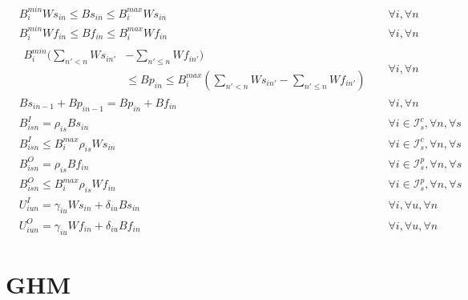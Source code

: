 \begin{align}
		  & B_{i}^{min} Ws_{in} \le Bs_{in} \le B_{i}^{max} Ws_{in} &&  \forall i, \forall n \\
		  & B_{i}^{min} Wf_{in} \le Bf_{in} \le B_{i}^{max} Wf_{in} &&  \forall i, \forall n \\
&\begin{aligned}
		   B_{i}^{min} (\sum_{n' < n} Ws_{in'} & - \sum_{n' \le n} Wf_{in'})\\ &\le Bp_{in} \le B_{i}^{max}  (\sum_{n' < n} Ws_{in'} - \sum_{n' \le n} Wf_{in'})  
\end{aligned}  && \forall i, \forall n \\
		  &Bs_{in-1} + Bp_{in-1} = Bp_{in} + Bf_{in} && \forall i, \forall n \\
		  &B_{isn}^I = \rho_{is} Bs_{in} && \forall i \in \mathcal{I}_{s}^c, \forall n, \forall s \\
		  &B_{isn}^I \le B_{i}^{max} \rho_{is} Ws_{in}  && \forall i \in \mathcal{I}_{s}^c, \forall n, \forall s \\
		  &B_{isn}^O = \rho_{is} Bf_{in} && \forall i \in \mathcal{I}_{s}^p, \forall n, \forall s \\
		  &B_{isn}^O \le B_{i}^{max} \rho_{is} Wf_{in}  && \forall i \in \mathcal{I}_{s}^p, \forall n, \forall s \\
		  &U_{iun}^{I} = \gamma_{iu} Ws_{in} + \delta_{iu} Bs_{in} && \forall i, \forall u, \forall n \\
		  &U_{iun}^{O} = \gamma_{iu} Wf_{in} + \delta_{iu} Bf_{in} && \forall i, \forall u, \forall n
\end{align}

\section{GHM}


